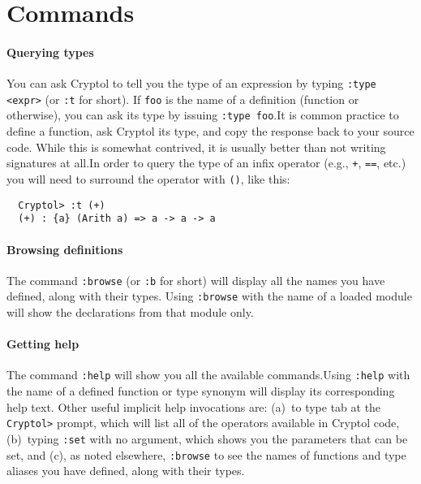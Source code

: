 
\section{Commands}
\label{sec:commands}

\paragraph*{Querying types}
You can ask Cryptol to tell you the type of an expression by typing
{\tt :type <expr>} (or {\tt :t} for short). If {\tt foo} is the name
of a definition (function or otherwise), you can ask its type by
issuing {\tt :type foo}.\indCmdType It is common practice to define a
function, ask Cryptol its type, and copy the response back to your
source code.  While this is somewhat contrived, it is usually better
than not writing signatures at all.\indSignature In order to query the
type of an infix operator (e.g., {\tt +}, {\tt ==}, etc.)  you will need
to surround the operator with {\tt ()}, like this:
\begin{Verbatim}
  Cryptol> :t (+)
  (+) : {a} (Arith a) => a -> a -> a
\end{Verbatim}

\paragraph*{Browsing definitions}
The command {\tt :browse} (or {\tt :b} for short) will display all the
names you have defined, along with their types.\indCmdBrowse
Using \texttt{:browse} with the name of a loaded module will show
the declarations from that module only.

\paragraph*{Getting help}
The command {\tt :help} will show you all the available
commands.\indCmdHelp Using \texttt{:help} with the name of a defined
function or type synonym will display its corresponding help text.
Other useful implicit help invocations are: (a)~to type tab at the
{\tt Cryptol>} prompt, which will list all of the operators available
in Cryptol code, (b)~typing {\tt :set} with no argument, which shows
you the parameters that can be set, and (c), as noted elsewhere,
\texttt{:browse} to see the names of functions and type aliases you
have defined, along with their types.

